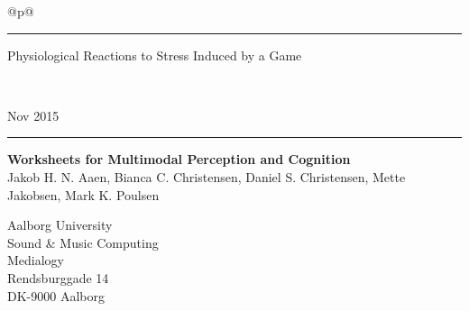 \def\navnA{Jakob H. N. Aaen}\def\navnB{Bianca C. Christensen}\def\navnC{Daniel S. Christensen}\def\navnD{Mette Jakobsen}\def\navnE{Mark K. Poulsen}
\def\ptitle{Physiological Reactions to Stress Induced by a Game}
\thispagestyle{empty}
\noindent%
\begin{tabular}{@{}p{\textwidth}@{}}
    \rule{\linewidth}{2mm}\vspace{1.5cm}
    \vspace*{-15mm}
    \begin{flushleft}
        \linespread{0.7}
        \fontsize{50}{60}\selectfont\sffamily
			\ptitle
    \end{flushleft} \\[5mm] 
    \raggedright{
        \fontsize{30}{40}\selectfont\sffamily
        Nov 2015\\ \vspace*{1mm}
    }
    \rule{\linewidth}{.7mm}
\end{tabular}
\begin{flushleft}
  {\Huge\sffamily\bfseries
      	Worksheets for Multimodal Perception and Cognition
  }\\
  \vspace{0.2cm}
  {\LARGE\sffamily
	    \navnA, \navnB, \navnC, \navnD, \navnE
  }
\end{flushleft}
\vfill
\begin{flushleft}\sffamily\large
  Aalborg University\\
  Sound \& Music Computing\\
  Medialogy\\
  Rendsburggade 14\\
  DK-9000 Aalborg
\end{flushleft}
